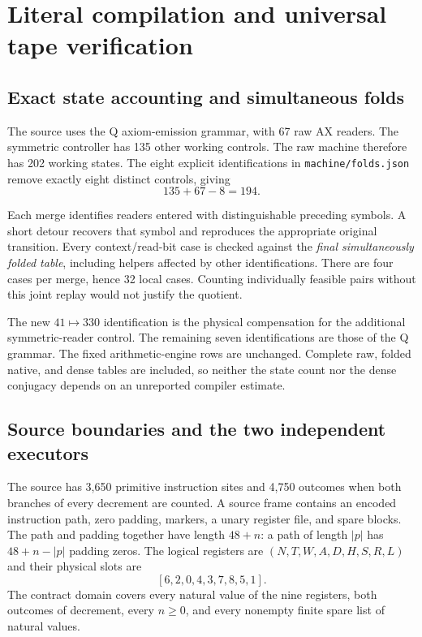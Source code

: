 \documentclass[11pt,letterpaper]{article}
\newcommand{\file}[1]{\texttt{\nolinkurl{#1}}}
\begin{document}


\section{Literal compilation and universal tape verification}\label{sec:physical}

\subsection{Exact state accounting and simultaneous folds}

The source uses the Q axiom-emission grammar, with 67 raw AX readers.
The symmetric controller has 135 other working controls. The raw
machine therefore has 202 working states. The eight explicit
identifications in \file{machine/folds.json} remove exactly eight
distinct controls, giving
\[
                 135+67-8=194.
\]


Each merge identifies readers entered with distinguishable preceding
symbols. A short detour recovers that symbol and reproduces the
appropriate original transition. Every context/read-bit case is checked
against the \emph{final simultaneously folded table}, including helpers
affected by other identifications. There are four cases per merge,
hence 32 local cases. Counting individually feasible pairs without this
joint replay would not justify the quotient.

The new $41\mapsto330$ identification is the physical compensation
for the additional symmetric-reader control. The remaining seven
identifications are those of the Q grammar. The fixed arithmetic-engine
rows are unchanged. Complete raw, folded native, and dense tables are
included, so neither the state count nor the dense conjugacy depends on
an unreported compiler estimate.

\subsection{Source boundaries and the two independent executors}

The source has 3,650 primitive instruction sites and 4,750 outcomes
when both branches of every decrement are counted. A source frame
contains an encoded instruction path, zero padding, markers, a unary
register file, and spare blocks. The path and padding together have
length $48+n$: a path of length $|p|$ has $48+n-|p|$ padding zeros. The logical registers
are $(N,T,W,A,D,H,S,R,L)$ and their physical slots are
\[
                    [6,2,0,4,3,7,8,5,1].
\]
The contract domain covers every natural value of the nine registers,
both outcomes of decrement, every $n\ge0$, and every nonempty finite
spare list of natural values.
\end{document}
